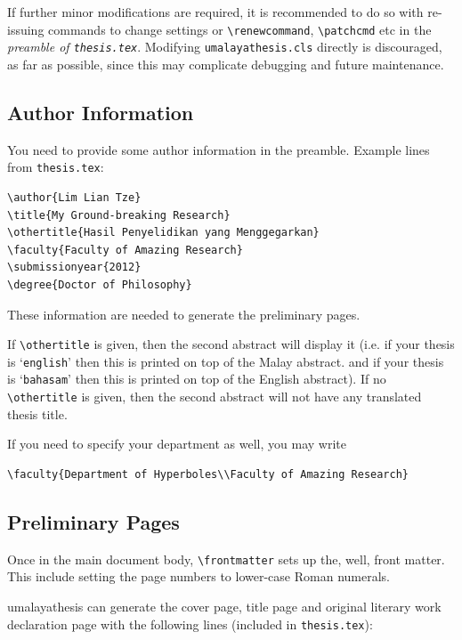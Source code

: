 If further minor modifications are required, it is recommended to do so with re-issuing commands to change settings or \verb|\renewcommand|, \verb|\patchcmd| etc in the \emph{preamble of \texttt{thesis.tex}}. Modifying \texttt{umalayathesis.cls} directly is discouraged, as far as possible, since this may complicate debugging and future maintenance.


\subsection{Author Information}\label{sec:author:info}
You need to provide some author information in the preamble. Example lines from \texttt{thesis.tex}:

\begin{lstlisting}[moretexcs={submissionyear,submissionmonth,faculty,othertitle,degree,qualification}]
\author{Lim Lian Tze}
\title{My Ground-breaking Research}
\othertitle{Hasil Penyelidikan yang Menggegarkan}
\faculty{Faculty of Amazing Research}
\submissionyear{2012}
\degree{Doctor of Philosophy}
\end{lstlisting}

These information are needed to generate the preliminary pages.

If \verb|\othertitle| is given, then the second abstract will display it
(i.e. if your thesis is `\texttt{english}' then this is printed on top of the Malay abstract.
and if your thesis is `\texttt{bahasam}' then this is printed on top of the English abstract).
If no \verb|\othertitle| is given, then the second abstract will not have any translated thesis title.

If you need to specify your department as well, you may write

\begin{lstlisting}
\faculty{Department of Hyperboles\\Faculty of Amazing Research}
\end{lstlisting}


\subsection{Preliminary Pages}\label{sec:prelim:pages}
Once in the main document body, \verb|\frontmatter| sets up the, well, front matter. This include setting the page numbers to lower-case Roman numerals.

\textsf{umalayathesis} can generate the cover page, title page and original literary work declaration page with the following lines (included in \texttt{thesis.tex}):



